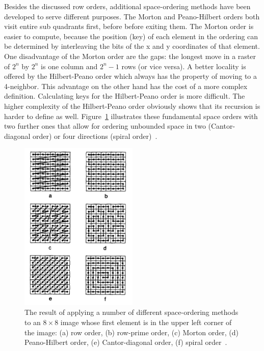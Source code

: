Besides the discussed row orders, additional space-ordering methods have been developed to serve different purposes. The Morton and Peano-Hilbert orders both visit entire sub quadrants first, before before exiting them. The Morton order is easier to compute, because the position (key) of each element in the ordering can be determined by interleaving the bits of the x and y coordinates of that element. One disadvantage of the Morton order are the gaps: the longest move in a raster of $2^n$ by $2^n$ is one column and $2^n - 1$ rows (or vice versa). A better locality is offered by the Hilbert-Peano order which always has the property of moving to a 4-neighbor. This advantage on the other hand has the cost of a more complex definition. Calculating keys for the Hilbert-Peano order is more difficult. The higher complexity of the Hilbert-Peano order obviously shows that its recursion is harder to define as well. Figure~\ref{fig:space-orders} illustrates these fundamental space orders with two further ones that allow for ordering unbounded space in two (Cantor-diagonal order) or four directions (spiral order)~\cite{Samet90spatialdata}.

\begin{figure}[h]
  \begin{center}
    \includegraphics[width=0.5\textwidth]{figures/space_orders.png}
    \caption{The result of applying a number of different space-ordering methods to an $8 \times 8$ image whose first element is in the upper left corner of the image: (a) row order, (b) row-prime order, (c) Morton order, (d) Peano-Hilbert order, (e) Cantor-diagonal order, (f) spiral order~\cite[p 14]{Samet90spatialdata}.}
    \label{fig:space-orders}
  \end{center}
\end{figure}

